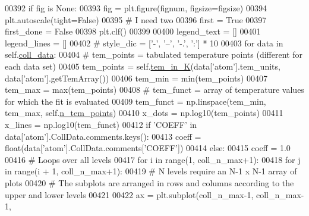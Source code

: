 \begin{DoxyCode}
00392         \textcolor{keywordflow}{if} fig \textcolor{keywordflow}{is} \textcolor{keywordtype}{None}:
00393             fig = plt.figure(fignum, figsize=figsize)
00394         plt.autoscale(tight=\textcolor{keyword}{False})
00395         \textcolor{comment}{# I need two }
00396         first = \textcolor{keyword}{True}
00397         first\_done = \textcolor{keyword}{False}
00398         plt.clf()
00399         
00400         legend\_text = []
00401         legend\_lines = []
00402 \textcolor{comment}{#        style\_dic = ['-', '--', '-.', ':'] * 10}
00403         \textcolor{keywordflow}{for} data \textcolor{keywordflow}{in} self.\hyperlink{classpyneb_1_1plot_1_1plot_atomic_data_1_1_data_plot_a50a9af3695633a64c66d082ed67d1bfb}{coll\_data}:
00404             \textcolor{comment}{# tem\_points = tabulated temperature points (different for each data set)}
00405             tem\_points = self.\hyperlink{classpyneb_1_1plot_1_1plot_atomic_data_1_1_data_plot_a44a19b283355d6c3ad1903e70009cfee}{tem\_in\_K}(data[\textcolor{stringliteral}{'atom'}].tem\_units, data[\textcolor{stringliteral}{'atom'}].getTemArray())
00406             tem\_min = min(tem\_points)
00407             tem\_max = max(tem\_points)
00408             \textcolor{comment}{# tem\_funct = array of temperature values for which the fit is evaluated}
00409             tem\_funct = np.linspace(tem\_min, tem\_max, self.\hyperlink{classpyneb_1_1plot_1_1plot_atomic_data_1_1_data_plot_a9f92ae121756c0e3d3624f11e3d2ae17}{n\_tem\_points})
00410             x\_dots = np.log10(tem\_points)
00411             x\_lines = np.log10(tem\_funct)
00412             \textcolor{keywordflow}{if} \textcolor{stringliteral}{'COEFF'} \textcolor{keywordflow}{in} data[\textcolor{stringliteral}{'atom'}].CollData.comments.keys():
00413                 coeff = float(data[\textcolor{stringliteral}{'atom'}].CollData.comments[\textcolor{stringliteral}{'COEFF'}])
00414             \textcolor{keywordflow}{else}:
00415                 coeff = 1.0
00416             \textcolor{comment}{# Loops over all levels}
00417             \textcolor{keywordflow}{for} i \textcolor{keywordflow}{in} range(1, coll\_n\_max+1):
00418                 \textcolor{keywordflow}{for} j \textcolor{keywordflow}{in} range(i + 1, coll\_n\_max+1):                
00419                         \textcolor{comment}{# N levels require an N-1 x N-1 array of plots}
00420                         \textcolor{comment}{# The subplots are arranged in rows and columns according to the upper and lower
       levels}
00421  
00422                         ax = plt.subplot(coll\_n\_max-1, coll\_n\_max-1, 

\end{DoxyCode}
